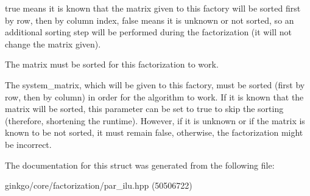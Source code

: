 {\ttfamily true} means it is known that the matrix given to this factory will be sorted first by row, then by column index, {\ttfamily false} means it is unknown or not sorted, so an additional sorting step will be performed during the factorization (it will not change the matrix given). 

The matrix must be sorted for this factorization to work.

The {\ttfamily system\+\_\+matrix}, which will be given to this factory, must be sorted (first by row, then by column) in order for the algorithm to work. If it is known that the matrix will be sorted, this parameter can be set to {\ttfamily true} to skip the sorting (therefore, shortening the runtime). However, if it is unknown or if the matrix is known to be not sorted, it must remain {\ttfamily false}, otherwise, the factorization might be incorrect. 

The documentation for this struct was generated from the following file\+:\begin{DoxyCompactItemize}
\item 
ginkgo/core/factorization/par\+\_\+ilu.\+hpp (50506722)\end{DoxyCompactItemize}
